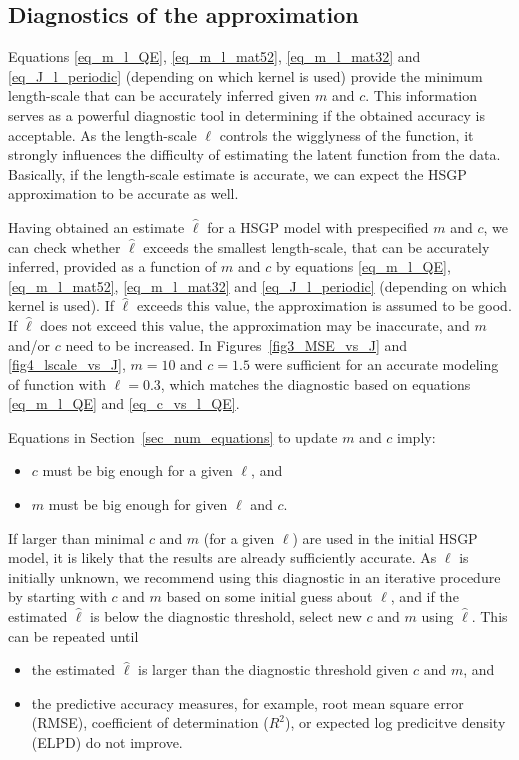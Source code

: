 \subsection{Diagnostics of the approximation} \label{subsec_diagnostics}

Equations \eqref{eq_m_l_QE}, \eqref{eq_m_l_mat52}, \eqref{eq_m_l_mat32} and \eqref{eq_J_l_periodic} (depending on which kernel is used) provide the minimum length-scale that can be accurately inferred given $m$ and $c$. This information serves as a powerful diagnostic tool in determining if the obtained accuracy is acceptable. As the length-scale $\ell$ controls the wigglyness of the function, it strongly influences the difficulty of estimating the latent function from the data. Basically, if the length-scale estimate is accurate, we can expect the HSGP approximation to be accurate as well.

Having obtained an estimate $\hat{\ell}$ for a HSGP model with prespecified $m$ and $c$, we can check whether $\hat{\ell}$ exceeds the smallest length-scale, that can be accurately inferred, provided as a function of $m$ and $c$ by equations \eqref{eq_m_l_QE}, \eqref{eq_m_l_mat52}, \eqref{eq_m_l_mat32} and \eqref{eq_J_l_periodic} (depending on which kernel is used). If $\hat{\ell}$ exceeds this value, the approximation is assumed to be good. If $\hat{\ell}$ does not exceed this value, the approximation may be inaccurate, and $m$ and/or $c$ need to be increased. In Figures~\ref{fig3_MSE_vs_J} and \ref{fig4_lscale_vs_J}, $m = 10$ and $c = 1.5$ were sufficient for an accurate modeling of function with $\ell = 0.3$, which matches the diagnostic based on equations \eqref{eq_m_l_QE} and \eqref{eq_c_vs_l_QE}.

Equations in Section~\ref{sec_num_equations} to update $m$ and $c$ imply:
% 
\begin{itemize}
	\item $c$ must be big enough for a given $\ell$, and
	\item $m$ must be big enough for given $\ell$ and $c$. 
\end{itemize}
%
If larger than minimal $c$ and $m$ (for a given $\ell$) are used in the initial HSGP model, it is likely that the results are already sufficiently accurate. As $\ell$ is initially unknown, we recommend using this diagnostic in an iterative procedure by starting with $c$ and $m$ based on some initial guess about $\ell$, and if the estimated $\hat{\ell}$ is below the diagnostic threshold, select new $c$ and $m$ using $\hat{\ell}$. This can be repeated until
%
\begin{itemize}
\item the estimated $\hat{\ell}$ is larger than the diagnostic threshold given $c$ and $m$, and
\item the predictive accuracy measures, for example, root mean square error (RMSE), coefficient of determination ($R^2$), or expected log predicitve density (ELPD) do not improve.
\end{itemize}

